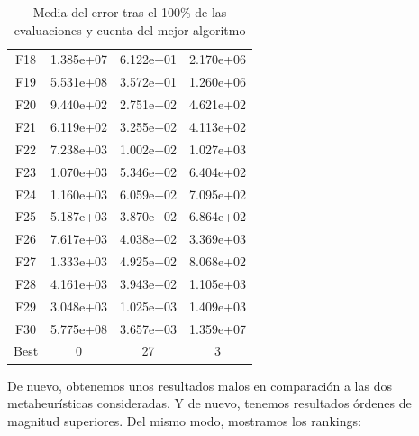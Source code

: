 \documentclass[11pt]{article}
\begin{document}
\begin{table}[H]
\begin{tabular}{|c|c|c|c|}
F18  &     1.385e+07 &  6.122e+01 &  2.170e+06 \\
F19  &     5.531e+08 &  3.572e+01 &  1.260e+06 \\
F20  &     9.440e+02 &  2.751e+02 &  4.621e+02 \\
F21  &     6.119e+02 &  3.255e+02 &  4.113e+02 \\
F22  &     7.238e+03 &  1.002e+02 &  1.027e+03 \\
F23  &     1.070e+03 &  5.346e+02 &  6.404e+02 \\
F24  &     1.160e+03 &  6.059e+02 &  7.095e+02 \\
F25  &     5.187e+03 &  3.870e+02 &  6.864e+02 \\
F26  &     7.617e+03 &  4.038e+02 &  3.369e+03 \\
F27  &     1.333e+03 &  4.925e+02 &  8.068e+02 \\
F28  &     4.161e+03 &  3.943e+02 &  1.105e+03 \\
F29  &     3.048e+03 &  1.025e+03 &  1.409e+03 \\
F30  &     5.775e+08 &  3.657e+03 &  1.359e+07 \\
Best &             0 &         27 &          3 \\
\hline
\end{tabular}
    \caption{Media del error tras el 100\% de las evaluaciones y cuenta del mejor algoritmo}
\end{table}

De nuevo, obtenemos unos resultados malos en comparación a las dos metaheurísticas consideradas. Y de nuevo, tenemos resultados órdenes de magnitud superiores. Del mismo modo, mostramos los rankings:
\end{document}
